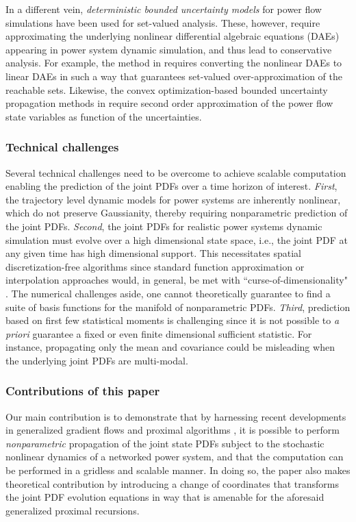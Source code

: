 \documentclass[10pt,twocolumn]{IEEEtran}
\begin{document}
In a different vein, \emph{deterministic bounded uncertainty models} for power flow simulations have been used \cite{dimitrovski2004boundary,hiskens2006sensitivity,chen2012method,althoff2014formal} for set-valued analysis. These, however, require approximating the underlying nonlinear differential algebraic equations (DAEs) appearing in power system dynamic simulation, and thus lead to conservative analysis. For example, the method in \cite{althoff2014formal} requires converting the nonlinear DAEs to linear DAEs in such a way that guarantees set-valued over-approximation of the reachable sets. Likewise, the convex optimization-based bounded uncertainty propagation methods in \cite{choi2017propagating,choi2018propagating} require second order approximation of the power flow state variables as function of the uncertainties.

\subsubsection{Technical challenges}\label{subsubsec:technicalchallenges}
Several technical challenges need to be overcome to achieve scalable computation enabling the prediction of the joint PDFs over a time horizon of interest. \emph{First}, the trajectory level dynamic models for power systems are inherently nonlinear, which do not preserve Gaussianity, thereby requiring nonparametric prediction of the joint PDFs. \emph{Second}, the joint PDFs for realistic power systems dynamic simulation must evolve over a high dimensional state space, i.e., the joint PDF at any given time has high dimensional support. This necessitates spatial discretization-free algorithms since standard function approximation or interpolation approaches would, in general, be met with ``curse-of-dimensionality" \cite{bellman1957}. The numerical challenges aside, one cannot theoretically guarantee to find a suite of basis functions for the manifold of nonparametric PDFs. \emph{Third}, prediction based on first few statistical moments is challenging since it is not possible to \emph{a priori} guarantee a fixed or even finite dimensional sufficient statistic. For instance, propagating only the mean and covariance could be misleading when the underlying joint PDFs are multi-modal.

\subsubsection{Contributions of this paper}
Our main contribution is to demonstrate that by harnessing recent developments in generalized gradient flows \cite{ambrosio2008gradient} and proximal algorithms \cite{parikh2014proximal}, it is possible to perform \emph{nonparametric} propagation of the joint state PDFs subject to the stochastic nonlinear dynamics of a networked power system, and that the computation can be performed in a gridless and scalable manner. In doing so, the paper also makes theoretical contribution by introducing a change of coordinates that transforms the joint PDF evolution equations in way that is amenable for the aforesaid generalized proximal recursions.
\end{document}
